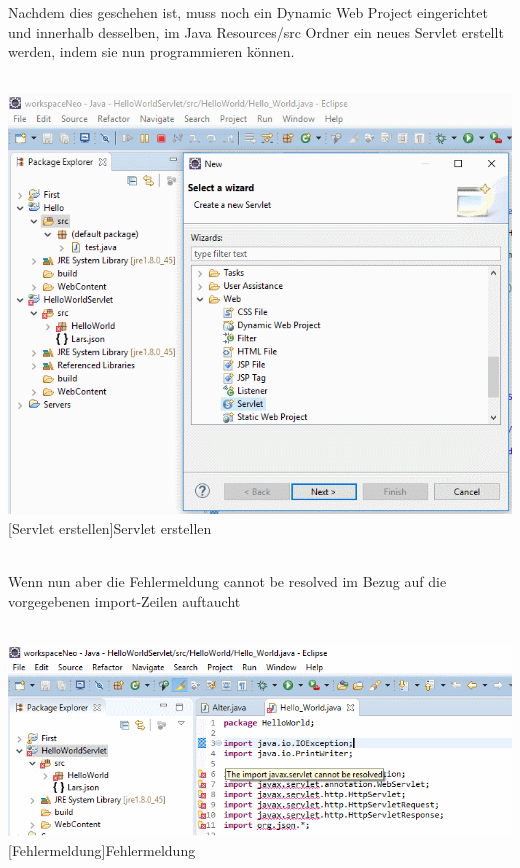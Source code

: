 \documentclass[12pt,a4paper,bibliography=totocnumbered,listof=totocnumbered]{scrartcl}
\begin{document}
Nachdem dies geschehen ist, muss noch ein Dynamic Web Project eingerichtet und innerhalb desselben, im Java Resources/src  Ordner ein neues Servlet erstellt werden, indem sie nun programmieren können.
\\
\\
\vspace{1em}
\begin{minipage}{\linewidth}
	\centering
	\includegraphics[width=0.7\linewidth]{Bilder/Eclipse-ServerErstellen2.png}
	[Servlet erstellen]{Servlet erstellen}	
	\label{fig:eclipse3}
\end{minipage}
\\

Wenn nun aber die Fehlermeldung  \glqq cannot be resolved\grqq{} im Bezug auf die vorgegebenen import-Zeilen auftaucht \\
\\
\vspace{1em}
\begin{minipage}{\linewidth}
	\centering
	\includegraphics[width=0.9\linewidth]{Bilder/Eclipse-ServerErstellen3.png}
	[Fehlermeldung]{Fehlermeldung}	
	\label{fig:eclipse4}
\end{minipage}
\\
\end{document}
